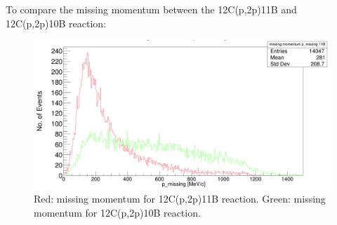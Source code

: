 \documentclass{report}
\begin{document}
To compare the missing momentum between the 12C(p,2p)11B and 12C(p,2p)10B reaction:\newline
\begin{figure}[!htb]
  \includegraphics[width=\linewidth]{missing_mom_compare.png}
  \caption{Red: missing momentum for 12C(p,2p)11B reaction. Green: missing momentum for 12C(p,2p)10B reaction.}
\end{figure}
\newline
\newpage
\end{document}

